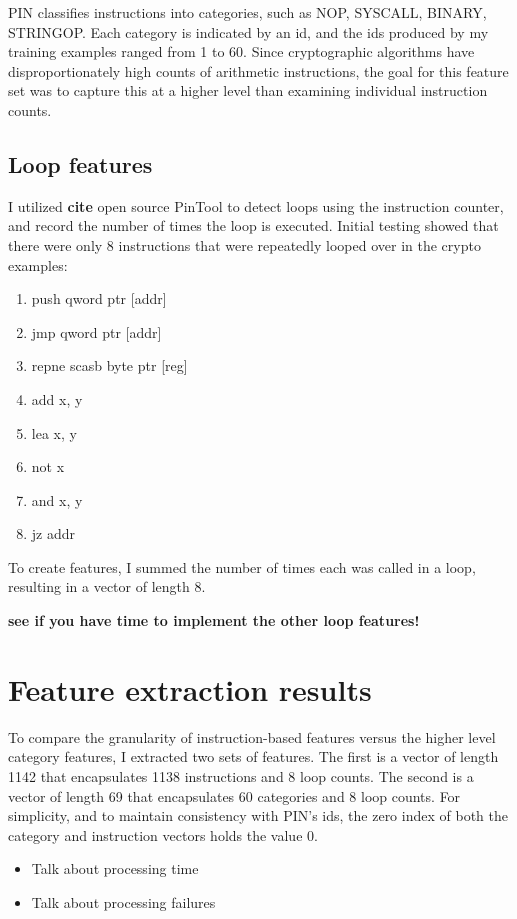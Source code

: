 PIN classifies instructions into categories, such as NOP, SYSCALL, BINARY, STRINGOP.  Each category is indicated by an id, and the ids produced by my training examples ranged from 1 to 60.  Since cryptographic algorithms have disproportionately high counts of arithmetic instructions, the goal for this feature set was to capture this at a higher level than examining individual instruction counts.


\subsection{Loop features}
I utilized \textbf{cite} open source PinTool to detect loops using the instruction counter, and record the number of times the loop is executed.  Initial testing showed that there were only 8 instructions that were repeatedly looped over in the crypto examples:
\begin{enumerate}
	\item push qword ptr [addr]
	\item jmp qword ptr [addr]
	\item repne scasb byte ptr [reg]
	\item add x, y
	\item lea x, y
	\item not x
	\item and x, y
	\item jz addr	
\end{enumerate}

To create features, I summed the number of times each was called in a loop, resulting in a vector of length 8.

\textbf{see if you have time to implement the other loop features!}

\section{Feature extraction results}
To compare the granularity of instruction-based features versus the higher level category features, I extracted two sets of features.  The first is a vector of length 1142 that encapsulates 1138 instructions and 8 loop counts.  The second is a vector of length 69 that encapsulates 60 categories and 8 loop counts.  For simplicity, and to maintain consistency with PIN's ids, the zero index of both the category and instruction vectors holds the value 0.

\begin{itemize}
	\item Talk about processing time
	\item Talk about processing failures
\end{itemize}

